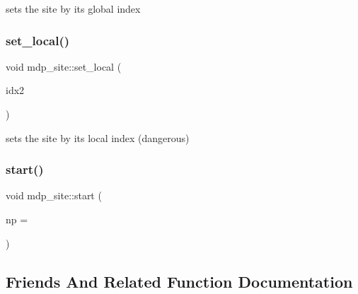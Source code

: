sets the site by its global index 

\mbox{\label{classmdp__site_a9545484331e101ce177d0877df305cbe}} 
\subsubsection{\texorpdfstring{set\+\_\+local()}{set\_local()}}
{\footnotesize\ttfamily void mdp\+\_\+site\+::set\+\_\+local (\begin{DoxyParamCaption}\item[{\hyperlink{mdp__global__vars_8h_aaa1ad9d0dcd2124aa5af0120d9954174}{mdp\+\_\+int}}]{idx2 }\end{DoxyParamCaption})\hspace{0.3cm}{\ttfamily [inline]}}



sets the site by its local index (dangerous) 

\mbox{\label{classmdp__site_a67f09ac8f2c14dc4461120244443532e}} 
\subsubsection{\texorpdfstring{start()}{start()}}
{\footnotesize\ttfamily void mdp\+\_\+site\+::start (\begin{DoxyParamCaption}\item[{int}]{np = {} }\end{DoxyParamCaption})\hspace{0.3cm}{\ttfamily [inline]}}



\subsection{Friends And Related Function Documentation}
\mbox{\label{classmdp__site_ac96405ecdb78dc33d55edea04876a931}} 
